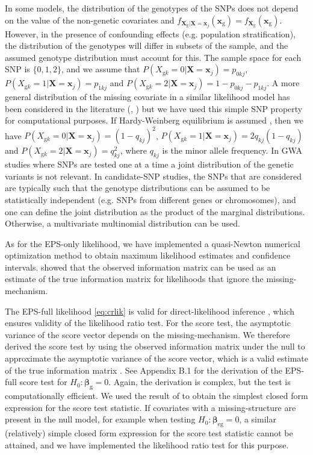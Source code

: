 \documentclass[10pt,a4paper]{article}
\def\bbetag{\bm{\beta}_{\text{g}}}
\def\bbetaeg{\bm{\beta}_{\text{eg}}}
\def\bx{\mathbf{x}}
\def\bX{\mathbf{X}}
\def\bxg{\mathbf{x}_{\text{g}}}
\def\bXg{\mathbf{X}_{\text{g}}}
\begin{document}
In some models, the distribution of the genotypes of the SNPs does not depend on the value of the non-genetic covariates and $f_{\bXg|\bX = \bx_j}(\bxg) = f_{\bXg}(\bxg)$. However, in the presence of confounding effects (e.g. population stratification), the distribution of the genotypes will differ in subsets of the sample, and the assumed genotype distribution must account for this. The sample space for each SNP is $\{0,1,2\}$, and we assume that $P(X_{\text{g}k} = 0|\bX = \bx_j) = p_{0kj}$, $P(X_{\text{g}k}=1|\bX = \bx_j) = p_{1kj}$ and $P(X_{\text{g}k}=2|\bX = \bx_j) = 1 - p_{0kj} - p_{1kj}$. A more general distribution of the missing covariate in a similar likelihood model has been considered in the literature (\cite{lawless1999semiparametric}, \cite{ibrahim2005missing}) but we have used this simple SNP property for computational purposes. If Hardy-Weinberg equilibrium is assumed \citep[page 39]{ziegler2010statistical}, then we have $P(X_{\text{g}k} = 0|\bX = \bx_j) = (1-q_{kj})^2$, $P(X_{\text{g}k}=1|\bX = \bx_j) = 2q_{kj}(1-q_{kj})$ and $P(X_{\text{g}k}=2|\bX = \bx_j) = q_{kj}^2$, where $q_{kj}$ is the minor allele frequency. In GWA studies where SNPs are tested one at a time a joint distribution of the genetic variants is not relevant. In candidate-SNP studies, the SNPs that are considered are typically such that the genotype distributions can be assumed to be statistically independent (e.g. SNPs from different genes or chromosomes), and one can define the joint distribution as the product of the marginal distributions. Otherwise, a multivariate multinomial distribution can be used.

As for the EPS-only likelihood, we have implemented a quasi-Newton numerical optimization method to obtain maximum likelihood estimates and confidence intervals. \cite{kenward1998likelihood} showed that the observed information matrix can be used as an estimate of the true information matrix for likelihoods that ignore the missing-mechanism.

The EPS-full likelihood \eqref{eq:crlik} is valid for direct-likelihood inference \citep{rubin1976inference}, which ensures validity of the likelihood ratio test. For the score test, the asymptotic variance of the score vector depends on the missing-mechanism. We therefore derived the score test by using the observed information matrix under the null to approximate the asymptotic variance of the score vector, which is a valid estimate of the true information matrix \citep{kenward1998likelihood}. See Appendix B.1 for the derivation of the EPS-full score test for $H_0: \bbetag = 0$. Again, the derivation is complex, but the test is computationally efficient. We used the result of \cite{derkach2015score} to obtain the simplest closed form expression for the score test statistic. If covariates with a missing-structure are present in the null model, for example when testing $H_0: \bbetaeg = 0$, a similar (relatively) simple closed form expression for the score test statistic cannot be attained, and we have implemented the likelihood ratio test for this purpose.
\end{document}
